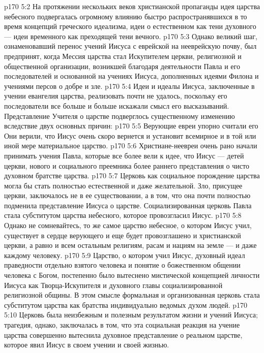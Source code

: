 \vs p170 5:2 На протяжении нескольких веков христианской пропаганды идея царства небесного подвергалась огромному влиянию быстро распространявшихся в то время концепций греческого идеализма, идеи о естественном как тени духовного --- идеи временного как преходящей тени вечного.
\vs p170 5:3 Однако великий шаг, ознаменовавший перенос учений Иисуса с еврейской на нееврейскую почву, был предпринят, когда Мессия царства стал Искупителем церкви, религиозной и общественной организации, возникшей благодаря деятельности Павла и его последователей и основанной на учениях Иисуса, дополненных идеями Филона и учениями персов о добре и зле.
\vs p170 5:4 Идеи и идеалы Иисуса, заключенные в учении евангелия царства, реализовать почти не удалось, поскольку его последователи все больше и больше искажали смысл его высказываний. Представление Учителя о царстве подверглось существенному изменению вследствие двух основных причин:
\vs p170 5:5 \bibnobreakspace Верующие евреи упорно считали его  Они верили, что Иисус очень скоро вернется и установит всемирное и в той или иной мере материальное царство.
\vs p170 5:6 \pc {}\bibnobreakspace Христиане\hyp{}неевреи очень рано начали принимать учения Павла, которые все более вели к идее, что Иисус ---  детей церкви, нового и социального преемника более раннего представления о чисто духовном братстве царства.
\vs p170 5:7 \pc Церковь как социальное порождение царства могла бы стать полностью естественной и даже желательной. Зло, присущее церкви, заключалось не в ее существовании, а в том, что она почти полностью подменила представление Иисуса о царстве. Социализированная церковь Павла стала субститутом царства небесного, которое провозгласил Иисус.
\vs p170 5:8 Однако не сомневайтесь, то же самое царство небесное, о котором Иисус учил, существует в сердце верующего и еще будет провозглашено и христианской церкви, а равно и всем остальным религиям, расам и нациям на земле --- и даже каждому человеку.
\vs p170 5:9 Царство, о котором учил Иисус, духовный идеал праведности отдельно взятого человека и понятие о божественном общении человека с Богом, постепенно было вытеснено мистической концепцией личности Иисуса как Творца\hyp{}Искупителя и духовного главы социализированной религиозной общины. В этом смысле формальная и организованная церковь стала субститутом царства как братства индивидуально ведомых духом людей.
\vs p170 5:10 Церковь была неизбежным и полезным  результатом жизни и учений Иисуса; трагедия, однако, заключалась в том, что эта социальная реакция на учение царства совершенно вытеснила духовное представление о реальном царстве, которое явил Иисус в своем учении и своей жизнью.
